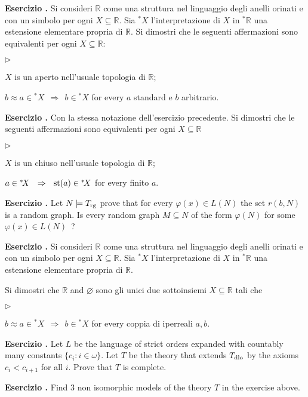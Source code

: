 \documentclass[10pt]{article}
\def\phi{\varphi}
\def\RR{\mathds R}
\def\0{\varnothing}
\def\IMP{\Rightarrow}
\newcommand{\labella}[1]{{\sf\footnotesize #1}\hfill}
\renewenvironment{itemize}
  {\begin{list}{$\triangleright$}{%
   \setlength{\parskip}{0mm}
   \setlength{\topsep}{0mm}
   \setlength{\rightmargin}{0mm}
   \setlength{\listparindent}{0mm}
   \setlength{\itemindent}{0mm}
   \setlength{\labelwidth}{3ex}
   \setlength{\itemsep}{0mm}
   \setlength{\parsep}{0mm}
   \setlength{\partopsep}{0mm}
   \setlength{\labelsep}{1ex}
   \setlength{\leftmargin}{\labelwidth+\labelsep}
   \let\makelabel\labella}}{%
   \end{list}}
\newcounter{ex}
\newenvironment{exercise}{\bigskip\addtocounter{ex}{1}\textbf{Esercizio \theex.\quad}}{}
\begin{document}
\clearpage%
\setcounter{ex}{0}


\begin{exercise}
Si consideri $\RR$ come una struttura nel linguaggio degli anelli orinati e con un simbolo per ogni $X\subseteq\RR$. Sia ${}^*\!X$ l'interpretazione di $X$ in ${}^*\!\RR$ una estensione elementare propria di $\RR$. Si dimostri che le seguenti affermazioni sono equivalenti per ogni $X\subseteq\RR$:\nobreak
\begin{itemize}
\item[1.]  $X$ is un aperto nell'usuale topologia di $\RR$;
\item[2.]  $b\approx a\in{}^*\!X \ \ \IMP\ \ b\in{}^*\!X$ for every $a$ standard e $b$ arbitrario.
\end{itemize}
\end{exercise}

\begin{exercise}
Con la stessa notazione dell'esercizio precedente. Si dimostri che le seguenti affermazioni sono equivalenti per ogni $X\subseteq\RR$\nobreak
\begin{itemize}
\item[1.]  $X$ is un chiuso nell'usuale topologia di $\RR$;
\item[2.]  $a\in{}^*\!X \ \ \IMP\ \ {\rm st}(a)\in{}^*\!X$ for every finito $a$.
\end{itemize}
\end{exercise}

\begin{exercise}
Let $N\models T_{\rm rg}$ prove that for every $\phi(x)\in L(N)$ the set $r(b,N)$ is a random graph.
Is every random graph $M\subseteq N$ of the form $\phi(N)$ for some $\phi(x)\in L(N)$~?
\end{exercise}

\clearpage%
\setcounter{ex}{0}

\begin{exercise}
Si consideri $\RR$ come una struttura nel linguaggio degli anelli orinati e con un simbolo per ogni $X\subseteq\RR$. Sia ${}^*\!X$ l'interpretazione di $X$ in ${}^*\!\RR$ una estensione elementare propria di $\RR$.

Si dimostri che $\RR$ and $\0$ sono gli unici due sottoinsiemi $X\subseteq\RR$ tali che\nobreak
\begin{itemize}
\item[]  $b\approx a\in{}^*\!X \ \ \IMP\ \ b\in{}^*\!X$ for every coppia di iperreali $a, b$.
\end{itemize}
\end{exercise}

\begin{exercise}
Let $L$ be the language of strict orders expanded with countably many constants $\big\{c_i: i\in\omega\big\}$.
Let $T$ be the theory that extends $T_{\rm dlo}$ by the axioms $c_i<c_{i+1}$ for all $i$.
Prove that $T$ is complete.
\end{exercise} 

\begin{exercise}
Find 3 non isomorphic models of the theory $T$ in the exercise above.
\end{exercise}
\end{document}
